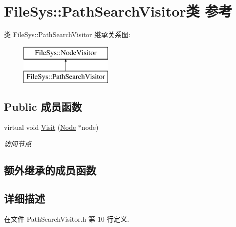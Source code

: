 \hypertarget{class_file_sys_1_1_path_search_visitor}{\section{File\-Sys\-:\-:Path\-Search\-Visitor类 参考}
\label{class_file_sys_1_1_path_search_visitor}
}
类 File\-Sys\-:\-:Path\-Search\-Visitor 继承关系图\-:\begin{figure}[H]
\begin{center}
\leavevmode
\includegraphics[height=2.000000cm]{class_file_sys_1_1_path_search_visitor}
\end{center}
\end{figure}
\subsection*{Public 成员函数}
\begin{DoxyCompactItemize}
\item 
virtual void \hyperlink{class_file_sys_1_1_path_search_visitor_ac9e8ab4c8389b118ba6a57b053ac8005}{Visit} (\hyperlink{class_file_sys_1_1_node}{Node} $\ast$node)
\begin{DoxyCompactList}\small\item\em 访问节点 \end{DoxyCompactList}\end{DoxyCompactItemize}
\subsection*{额外继承的成员函数}


\subsection{详细描述}


在文件 Path\-Search\-Visitor.\-h 第 10 行定义.



